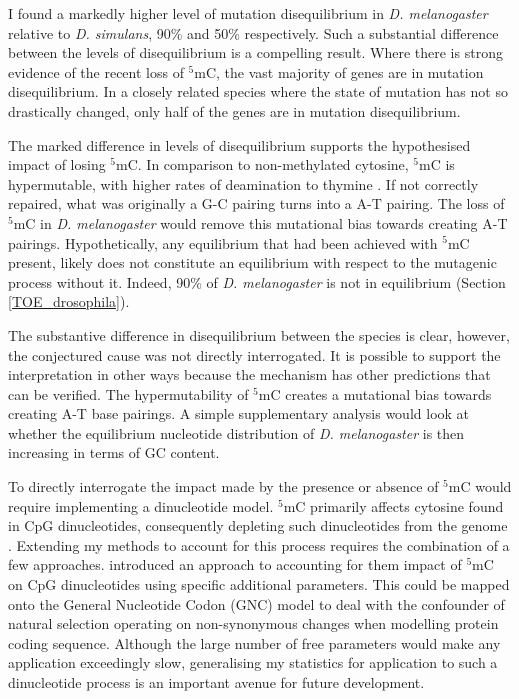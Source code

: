I found a markedly higher level of mutation disequilibrium in \textit{D. melanogaster} relative to \textit{D. simulans}, 90\% and 50\% respectively. Such a substantial difference between the levels of disequilibrium is a compelling result. Where there is strong evidence of the recent loss of $^5$mC, the vast majority of genes are in mutation disequilibrium. In a closely related species where the state of mutation has not so drastically changed, only half of the genes are in mutation disequilibrium.

The marked difference in levels of disequilibrium supports the hypothesised impact of losing $^5$mC. In comparison to non-methylated cytosine, $^5$mC is hypermutable, with higher rates of deamination to thymine \citep{Shen1994TheDNA, Coulondre1978MolecularColi}. If not correctly repaired, what was originally a G-C pairing turns into a A-T pairing. The loss of $^5$mC in \textit{D. melanogaster} would remove this mutational bias towards creating A-T pairings. Hypothetically, any equilibrium that had been achieved with $^5$mC present, likely does not constitute an equilibrium with respect to the mutagenic process without it. Indeed, 90\% of \textit{D. melanogaster} is not in equilibrium (Section \ref{TOE_drosophila}). 

The substantive difference in disequilibrium between the species is clear, however, the conjectured cause was not directly interrogated. It is possible to support the interpretation in other ways because the mechanism has other predictions that can be verified. The hypermutability of $^5$mC creates a mutational bias towards creating A-T base pairings. A simple supplementary analysis would look at whether the equilibrium nucleotide distribution of \textit{D. melanogaster} is then increasing in terms of GC content. 

To directly interrogate the impact made by the presence or absence of $^5$mC would require implementing a dinucleotide model. $^5$mC primarily affects cytosine found in CpG dinucleotides, consequently depleting such dinucleotides from the genome \citep{Holliday1975DNADevelopment, Bird1980DNADNA}. Extending my methods to account for this process requires the combination of a few approaches. \cite{Huttley2004ModelingMammals} introduced an approach to accounting for them impact of $^5$mC on CpG dinucleotides using specific additional parameters. This could be mapped onto the General Nucleotide Codon (GNC) model \citep{Kaehler2017StandardData} to deal with the confounder of natural selection operating on non-synonymous changes when modelling protein coding sequence. Although the large number of free parameters would make any application exceedingly slow, generalising my statistics for application to such a dinucleotide process is an important avenue for future development. 

